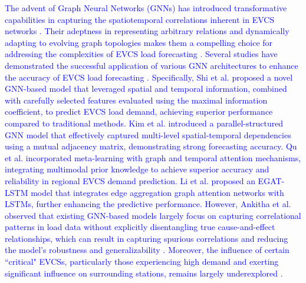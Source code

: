 \documentclass[lettersize,journal]{IEEEtran}
\newcommand{\hl}[1]{\textcolor{blue}{#1}}
\begin{document}
\hl{The advent of Graph Neural Networks (GNNs) has introduced transformative capabilities in capturing the spatiotemporal correlations inherent in EVCS networks \cite{journal/energy2023/278Wang}. Their adeptness in representing arbitrary relations and dynamically adapting to evolving graph topologies makes them a compelling choice for addressing the complexities of EVCS load forecasting \cite{journal/tkde2023/10Chen, conference/ijcai2019/1907Wu}. Several studies have demonstrated the successful application of various GNN architectures to enhance the accuracy of EVCS load forecasting \cite{journal/ojvt2024/5rashid}. Specifically, Shi et al. \cite{journal/tsg2024/shi} proposed a novel GNN-based model that leveraged spatial and temporal information, combined with carefully selected features evaluated using the maximal information coefficient, to predict EVCS load demand, achieving superior performance compared to traditional methods. Kim et al. \cite{journal/tsg2024/15Kim} introduced a parallel-structured GNN model that effectively captured multi-level spatial-temporal dependencies using a mutual adjacency matrix, demonstrating strong forecasting accuracy. Qu et al. \cite{journal/tits2024/25Qu} incorporated meta-learning with graph and temporal attention mechanisms, integrating multimodal prior knowledge to achieve superior accuracy and reliability in regional EVCS demand prediction. Li et al. \cite{journal/tpwrs2024/39Li} proposed an EGAT-LSTM model that integrates edge aggregation graph attention networks with LSTMs, further enhancing the predictive performance.
However, Ankitha et al. \cite{journal/tpwrs2024/39Prasanna} observed that existing GNN-based models largely focus on capturing correlational patterns in load data without explicitly disentangling true cause-and-effect relationships, which can result in capturing spurious correlations and reducing the model's robustness and generalizability \cite{lan2024spatiotemporal}. Moreover, the influence of certain ``critical" EVCSs, particularly those experiencing high demand and exerting significant influence on surrounding stations, remains largely underexplored \cite{kong2024spatio}.}

\end{document}
